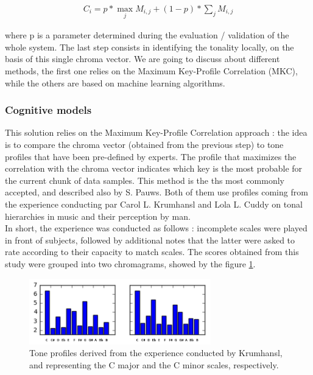 \documentclass[letterpaper]{article}
\begin{document}
\begin{align}
C_{i} = p * \max_{j} M_{i, j} + (1 - p) * \sum_{j} M_{i, j}
\end{align}

where p is a parameter determined during the evaluation / validation of the whole system.
The last step consists in identifying the tonality locally,
on the basis of this single chroma vector. We are going to discuss about different methods, the first one relies on the Maximum Key-Profile Correlation (MKC),
while the others are based on machine learning algorithms.

\subsubsection{Cognitive models}

This solution relies on the Maximum Key-Profile Correlation approach : the idea is to compare the chroma vector (obtained from the previous step) to
tone profiles that have been pre-defined by experts. The profile that maximizes the correlation with the chroma vector indicates which key is the most probable
for the current chunk of data samples. \citep{AT} This method is the ths most commonly accepted, and described also by S. Pauws. \citep{SP} Both of them use profiles coming from the experience conducting par Carol L. Krumhansl and Lola L. Cuddy on tonal hierarchies in music and their perception by man.\\

In short, the experience was conducted as follows : incomplete scales were played in front of subjects, followed by additional notes that the latter were asked to rate according to their capacity to match scales. The scores obtained from this study were grouped into two chromagrams, showed by the figure \ref{krumhansl}. \\

\begin{figure}
\begin{center}
\includegraphics[width=3.1in,angle=0]{imgs/Krumhansl.png}
\caption{Tone profiles derived from the experience conducted by Krumhansl, and representing the C major and the C minor scales, respectively.}
\label{krumhansl}
\end{center}
\end{figure}
\end{document}
